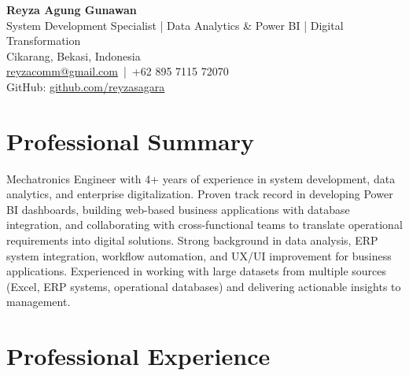 \documentclass[a4paper,10pt]{article}
\begin{document}
\begin{center}
    {\LARGE \textbf{Reyza Agung Gunawan}}\\
    \vspace{4pt}
    System Development Specialist | Data Analytics \& Power BI | Digital Transformation\\
    \vspace{4pt}
    Cikarang, Bekasi, Indonesia\\
    \href{mailto:reyzacomm@gmail.com}{reyzacomm@gmail.com} \,|\, +62 895 7115 72070\\
    GitHub: \href{https://github.com/reyzasagara}{github.com/reyzasagara}
\end{center}

\vspace{6pt}

\section*{Professional Summary}
Mechatronics Engineer with 4+ years of experience in system development, data analytics, and enterprise digitalization. Proven track record in developing Power BI dashboards, building web-based business applications with database integration, and collaborating with cross-functional teams to translate operational requirements into digital solutions. Strong background in data analysis, ERP system integration, workflow automation, and UX/UI improvement for business applications. Experienced in working with large datasets from multiple sources (Excel, ERP systems, operational databases) and delivering actionable insights to management.

\section*{Professional Experience}
\end{document}
